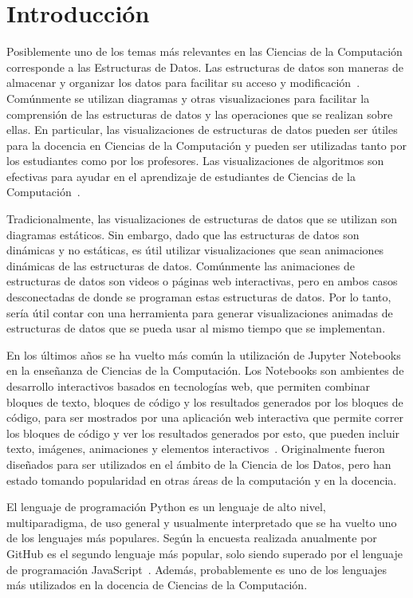 \chapter{Introducción}

Posiblemente uno de los temas más relevantes en las Ciencias de la Computación corresponde a las Estructuras de Datos. Las estructuras de datos son maneras de almacenar y organizar los datos para facilitar su acceso y modificación~\cite{Algorithms}. Comúnmente se utilizan diagramas y otras visualizaciones para facilitar la comprensión de las estructuras de datos y las operaciones que se realizan sobre ellas. En particular, las visualizaciones de estructuras de datos pueden ser útiles para la docencia en Ciencias de la Computación y pueden ser utilizadas tanto por los estudiantes como por los profesores. Las visualizaciones de algoritmos son efectivas para ayudar en el aprendizaje de estudiantes de Ciencias de la Computación~\cite{Hundhausen2002}.

Tradicionalmente, las visualizaciones de estructuras de datos que se utilizan son diagramas estáticos. Sin embargo, dado que las estructuras de datos son dinámicas y no estáticas, es útil utilizar visualizaciones que sean animaciones dinámicas de las estructuras de datos. Comúnmente las animaciones de estructuras de datos son videos o páginas web interactivas, pero en ambos casos desconectadas de donde se programan estas estructuras de datos. Por lo tanto, sería útil contar con una herramienta para generar visualizaciones animadas de estructuras de datos que se pueda usar al mismo tiempo que se implementan.

En los últimos años se ha vuelto más común la utilización de Jupyter Notebooks en la enseñanza de Ciencias de la Computación. Los Notebooks son ambientes de desarrollo interactivos basados en tecnologías web, que permiten combinar bloques de texto, bloques de código y los resultados generados por los bloques de código, para ser mostrados por una aplicación web interactiva que permite correr los bloques de código y ver los resultados generados por esto, que pueden incluir texto, imágenes, animaciones y elementos interactivos~\cite{kluyver2016jupyter}. Originalmente fueron diseñados para ser utilizados en el ámbito de la Ciencia de los Datos, pero han estado tomando popularidad en otras áreas de la computación y en la docencia.

El lenguaje de programación Python es un lenguaje de alto nivel, multiparadigma, de uso general y usualmente interpretado que se ha vuelto uno de los lenguajes más populares. Según la encuesta realizada anualmente por GitHub es el segundo lenguaje más popular, solo siendo superado por el lenguaje de programación JavaScript~\cite{encuesta-github}. Además, probablemente es uno de los lenguajes más utilizados en la docencia de Ciencias de la Computación.

